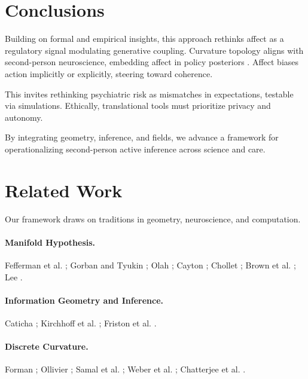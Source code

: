 \documentclass{article}
\theoremstyle{definition}
\begin{document}
\section{Conclusions}

Building on formal and empirical insights, this approach rethinks affect as a regulatory signal modulating generative coupling. Curvature topology aligns with second-person neuroscience, embedding affect in policy posteriors \cite{dacosta2020planning}. Affect biases action implicitly or explicitly, steering toward coherence.

This invites rethinking psychiatric risk as mismatches in expectations, testable via simulations. Ethically, translational tools must prioritize privacy and autonomy.

By integrating geometry, inference, and fields, we advance a framework for operationalizing second-person active inference across science and care.

\section{Related Work}

Our framework draws on traditions in geometry, neuroscience, and computation.

\paragraph{Manifold Hypothesis.} Fefferman et al. \cite{fefferman2016testing}; Gorban and Tyukin \cite{gorban2018blessing}; Olah \cite{olah2014blog}; Cayton \cite{cayton2005algorithms}; Chollet \cite{chollet2021deep}; Brown et al. \cite{brown2023union}; Lee \cite{lee2023geometric}.

\paragraph{Information Geometry and Inference.} Caticha \cite{caticha2015geometry}; Kirchhoff et al. \cite{kirchhoff2018markov}; Friston et al. \cite{friston2017graphical}.

\paragraph{Discrete Curvature.} Forman \cite{forman2003bochner}; Ollivier \cite{ollivier2009ricci}; Samal et al. \cite{samal2018comparative}; Weber et al. \cite{weber2019curvature}; Chatterjee et al. \cite{chatterjee2021detecting}.
\end{document}
